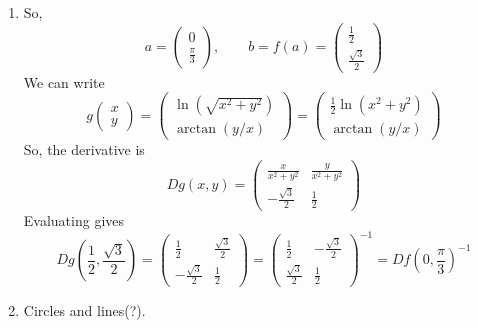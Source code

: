 \begin{solution}
\begin{enumerate}
			\item So, 
				\begin{equation}
					a = \begin{pmatrix} 0 \\ \frac{\pi}{3} \end{pmatrix}, \qquad b = f(a) = \begin{pmatrix} \frac{1}{2} \\ \frac{\sqrt{3}}{2} \end{pmatrix}
				\end{equation}
				We can write 
				\begin{equation}
					g\begin{pmatrix} x \\ y \end{pmatrix} = \begin{pmatrix} \ln(\sqrt{x^2 + y^2}) \\ \arctan(y/x) \end{pmatrix} = \begin{pmatrix} \frac{1}{2} \ln(x^2 + y^2) \\ \arctan(y/x) \end{pmatrix}
				\end{equation}
				So, the derivative is 
				\begin{equation}
					Dg(x, y) = \begin{pmatrix} 
						\frac{x}{x^2 + y^2} & \frac{y}{x^2 + y^2} \\ 
						-\frac{\sqrt{3}}{2} & \frac{1}{2} 
					\end{pmatrix} 
				\end{equation}
				Evaluating gives 
				\begin{equation}
					Dg(\frac{1}{2}, \frac{\sqrt{3}}{2}) = \begin{pmatrix} \frac{1}{2} & \frac{\sqrt{3}}{2} \\ - \frac{\sqrt{3}}{2} & \frac{1}{2} \end{pmatrix} = \begin{pmatrix} \frac{1}{2} & -\frac{\sqrt{3}}{2} \\ \frac{\sqrt{3}}{2} & \frac{1}{2} \end{pmatrix}^{-1} = Df(0, \frac{\pi}{3})^{-1}
				\end{equation}

			\item Circles and lines(?).
		\end{enumerate}
	\end{solution}

